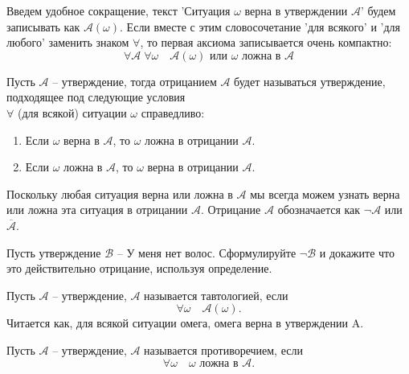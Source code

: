 Введем удобное сокращение, текст 'Ситуация $ \omega $ верна в утверждении $\mathcal{A}$' будем записывать как $\mathcal{A}(\omega)$.
Если вместе с этим словосочетание 'для всякого' и 'для любого' заменить знаком $ \forall $, то первая аксиома записывается очень компактно: \[
  \forall \mathcal{A}\; \forall \omega \quad \mathcal{A}(\omega) \text{ или } \omega \text{ ложна в } \mathcal{A} \]

\begin{definition}\label{negation}
  Пусть $\mathcal{A}$ -- утверждение, тогда отрицанием $\mathcal{A}$ будет называться утверждение, подходящее под следующие условия\\
  
  $ \forall $ (для всякой) ситуации $\omega$ справедливо: \begin{enumerate}
    \item Если $ \omega $ верна в $ \mathcal{A} $, то $\omega$ ложна в отрицании $\mathcal{A}$.
    \item Если $ \omega $ ложна в $\mathcal{A}$, то $ \omega $ верна в отрицании $\mathcal{A}$.
  \end{enumerate}
\end{definition}

Поскольку любая ситуация верна или ложна в $\mathcal{A}$ мы всегда можем узнать верна или ложна эта ситуация в отрицании $\mathcal{A}$. Отрицание $\mathcal{A}$  обозначается как $ \neg\mathcal{A} $ или $ \overline{\mathcal{A}} $.

\begin{exercise}
  Пусть утверждение $\mathcal{B}$ -- У меня нет волос. Сформулируйте $\neg\mathcal{B}$ и докажите что это 
  действительно отрицание, используя определение.
\end{exercise}

\begin{definition}
  Пусть $\mathcal{A}$ -- утверждение, $\mathcal{A}$ называется тавтологией, если \[
     \forall \omega \quad \mathcal{A}(\omega). \]
  Читается как, для всякой ситуации омега, омега верна в утверждении A.
\end{definition}
\begin{definition}
  Пусть $\mathcal{A}$ -- утверждение, $\mathcal{A}$ называется противоречием, если \[
     \forall \omega \quad \omega \text{ ложна в } \mathcal{A}. \]
\end{definition}

